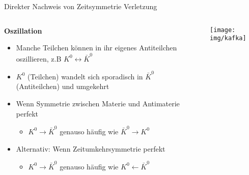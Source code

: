\begin{frame}{Direkter Nachweis von Zeitsymmetrie Verletzung}
    \begin{columns}
        \begin{column}{.7\textwidth}
            \textbf{Oszillation}
            \begin{itemize}
                \item Manche Teilchen können in ihr eigenes Antiteilchen oszillieren, z.B $K^0 \!\leftrightarrow \bar K^0$
                \item $K^0$ (Teilchen) wandelt sich sporadisch in $\bar K^0$ (Antiteilchen) und umgekehrt
                \item Wenn Symmetrie zwischen Materie und Antimaterie perfekt
                \begin{itemize}
                    \item $K^0 \!\to \bar K^0$ genauso häufig wie $\bar K^0 \!\to K^0$
                \end{itemize}
                \item Alternativ: Wenn Zeitumkehrsymmetrie perfekt
                \begin{itemize}
                    \item $K^0 \!\to \bar K^0$ genauso häufig wie $K^0 \!\leftarrow \bar K^0$
                \end{itemize}
            \end{itemize}
        \end{column}

        \begin{column}{.3\textwidth}
            \centering
            \texttt{[image: img/kafka]}
        \end{column}
    \end{columns}
\end{frame}

